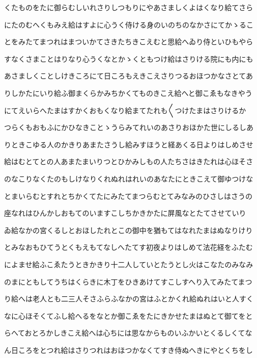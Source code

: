 \documentclass[a4paper,11pt,landscape]{ltjtarticle}
\begin{document}
\par\medskip
くたものをたに御らむしいれさりしつもりにやあさましくよはくなり給てさら
\par\medskip
にたのむへくもみえ給はすよに心うく侍ける身のいのちのなかさにてかゝるこ
\par\medskip
とをみたてまつれはまついかてさきたちきこえむと思給へゐり侍といひもやら
\par\medskip
すなくさまことはりなり心うくなとかゝくともつけ給はさりける院にも内にも
\par\medskip
あさましくことしけきころにて日ころもえきこえさりつるおほつかなさとてあ
\par\medskip
りしかたにいり給ふ御まくらかみちかくてものきこえ給へと御こゑもなきやう
\par\medskip
にてえいらへたまはすかくおもくなり給まてたれも〱つけたまはさりけるか
\par\medskip
つらくもおもふにかひなきことゝうらみてれいのあさりおほかた世にしるしあ
\par\medskip
りときこゆる人のかきりあまたさうし給みすほうと経あくる日よりはしめさせ
\par\medskip
給はむとてとの人あまたまいりつとひかみしもの人たちさはきたれは心ほそさ
\par\medskip
のなこりなくたのもしけなりくれぬれはれいのあなたにときこえて御ゆつけな
\par\medskip
とまいらむとすれとちかくてたにみたてまつらむとてみなみのひさしはさうの
\par\medskip
座なれはひんかしおもてのいますこしちかきかたに屏風なとたてさせていり
\par\medskip
ゐ給なかの宮くるしとおほしたれとこの御中を猶もてはなれたまはぬなりけり
\par\medskip
とみなおもひてうとくもえもてなしへたてす初夜よりはしめて法花経をふたむ
\par\medskip
によませ給ふこゑたうときかきり十二人していとたうとし火はこなたのみなみ
\par\medskip
のまにともしてうちはくらきに木丁をひきあけてすこしすへり入てみたてまつ
\par\medskip
り給へは老人とも二三人そさふらふなかの宮はふとかくれ給ぬれはいと人すく
\par\medskip
なに心ほそくてふし給へるをなとか御こゑをたにきかせたまはぬとて御てをと
\par\medskip
らへておとろかしきこえ給へは心ちには思なからものいふかいとくるしくてな
\par\medskip
ん日ころをとつれ給はさりつれはおほつかなくてすき侍ぬへきにやとくちをし
\end{document}
